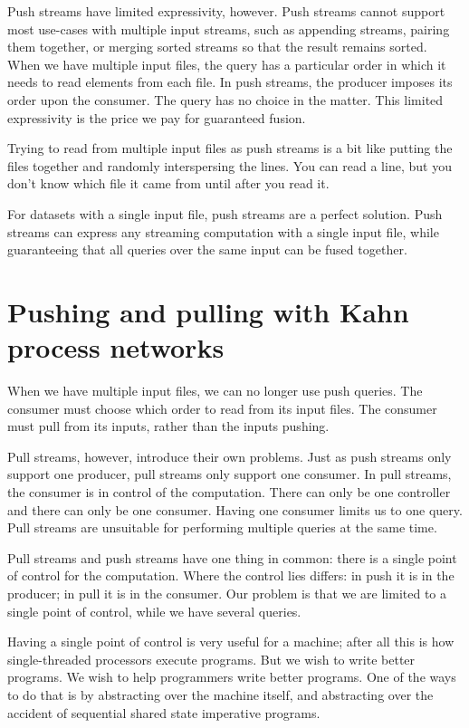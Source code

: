 Push streams have limited expressivity, however.
Push streams cannot support most use-cases with multiple input streams, such as appending streams, pairing them together, or merging sorted streams so that the result remains sorted.
When we have multiple input files, the query has a particular order in which it needs to read elements from each file.
In push streams, the producer imposes its order upon the consumer.
The query has no choice in the matter.
This limited expressivity is the price we pay for guaranteed fusion.

Trying to read from multiple input files as push streams is a bit like putting the files together and randomly interspersing the lines.
You can read a line, but you don't know which file it came from until after you read it.

For datasets with a single input file, push streams are a perfect solution.
Push streams can express any streaming computation with a single input file, while guaranteeing that all queries over the same input can be fused together.

\section{Pushing and pulling with Kahn process networks}

When we have multiple input files, we can no longer use push queries.
The consumer must choose which order to read from its input files.
The consumer must pull from its inputs, rather than the inputs pushing.

Pull streams, however, introduce their own problems.
Just as push streams only support one producer, pull streams only support one consumer.
In pull streams, the consumer is in control of the computation.
There can only be one controller and there can only be one consumer.
Having one consumer limits us to one query.
Pull streams are unsuitable for performing multiple queries at the same time.


Pull streams and push streams have one thing in common: there is a single point of control for the computation.
Where the control lies differs: in push it is in the producer; in pull it is in the consumer.
Our problem is that we are limited to a single point of control, while we have several queries.

Having a single point of control is very useful for a machine; after all this is how single-threaded processors execute programs.
But we wish to write better programs.
We wish to help programmers write better programs.
One of the ways to do that is by abstracting over the machine itself, and abstracting over the accident of sequential shared state imperative programs.


